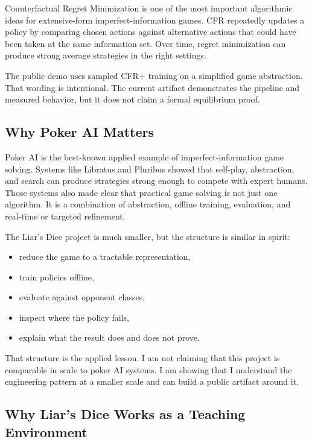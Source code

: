 \documentclass[
]{article}
\providecommand{\tightlist}{%
  \setlength{\itemsep}{0pt}\setlength{\parskip}{0pt}}
\begin{document}
Counterfactual Regret Minimization is one of the most important
algorithmic ideas for extensive-form imperfect-information games. CFR
repeatedly updates a policy by comparing chosen actions against
alternative actions that could have been taken at the same information
set. Over time, regret minimization can produce strong average
strategies in the right settings.

The public demo uses sampled CFR+ training on a simplified game
abstraction. That wording is intentional. The current artifact
demonstrates the pipeline and measured behavior, but it does not claim a
formal equilibrium proof.

\subsection{Why Poker AI Matters}\label{why-poker-ai-matters}

Poker AI is the best-known applied example of imperfect-information game
solving. Systems like Libratus and Pluribus showed that self-play,
abstraction, and search can produce strategies strong enough to compete
with expert humans. Those systems also made clear that practical game
solving is not just one algorithm. It is a combination of abstraction,
offline training, evaluation, and real-time or targeted refinement.

The Liar's Dice project is much smaller, but the structure is similar in
spirit:

\begin{itemize}
\tightlist
\item
  reduce the game to a tractable representation,
\item
  train policies offline,
\item
  evaluate against opponent classes,
\item
  inspect where the policy fails,
\item
  explain what the result does and does not prove.
\end{itemize}

That structure is the applied lesson. I am not claiming that this
project is comparable in scale to poker AI systems. I am showing that I
understand the engineering pattern at a smaller scale and can build a
public artifact around it.

\subsection{Why Liar's Dice Works as a Teaching
Environment}\label{why-liars-dice-works-as-a-teaching-environment}
\end{document}
